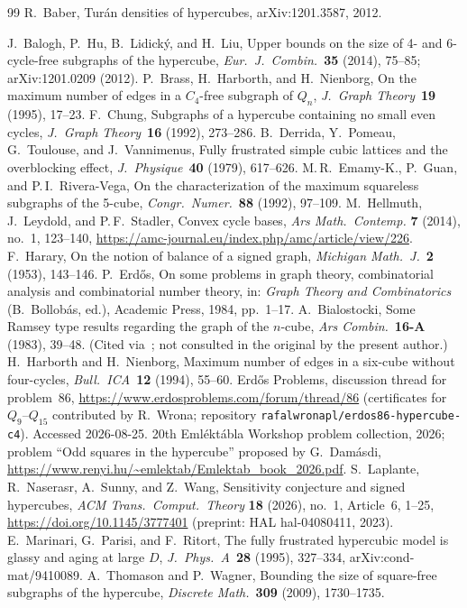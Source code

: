 \documentclass[12pt,a4paper]{article}
\theoremstyle{definition}
\begin{document}
\begin{thebibliography}{99}
R.~Baber,
Tur\'an densities of hypercubes,
arXiv:1201.3587, 2012.

 J.~Balogh, P.~Hu, B.~Lidick\'y, and H.~Liu, Upper bounds on
  the size of 4- and 6-cycle-free subgraphs of the hypercube,
  \textit{Eur.\ J.\ Combin.}\ \textbf{35} (2014), 75--85; arXiv:1201.0209 (2012).
 P.~Brass, H.~Harborth, and H.~Nienborg, On the maximum number
  of edges in a $C_4$-free subgraph of $Q_n$,
  \textit{J.\ Graph Theory}\ \textbf{19} (1995), 17--23.
 F.~Chung, Subgraphs of a hypercube containing no small even
  cycles, \textit{J.\ Graph Theory}\ \textbf{16} (1992), 273--286.
 B.~Derrida, Y.~Pomeau, G.~Toulouse, and J.~Vannimenus,
  Fully frustrated simple cubic lattices and the overblocking effect,
  \textit{J.\ Physique}\ \textbf{40} (1979), 617--626.
 M.\,R.~Emamy-K., P.~Guan, and P.\,I.~Rivera-Vega, On the
  characterization of the maximum squareless subgraphs of the 5-cube,
  \textit{Congr.\ Numer.}\ \textbf{88} (1992), 97--109.
 M.~Hellmuth, J.~Leydold, and P.\,F.~Stadler, Convex cycle
  bases, \textit{Ars Math.\ Contemp.} \textbf{7} (2014), no.~1, 123--140,
  \url{https://amc-journal.eu/index.php/amc/article/view/226}.
 F.~Harary, On the notion of balance of a signed graph,
  \textit{Michigan Math.\ J.}\ \textbf{2} (1953), 143--146.
 P.~Erd\H{o}s, On some problems in graph theory, combinatorial
  analysis and combinatorial number theory, in: \textit{Graph Theory and
  Combinatorics} (B.~Bollob\'as, ed.), Academic Press, 1984, pp.~1--17.
 A.~Bialostocki, Some Ramsey type results regarding the graph
  of the $n$-cube, \textit{Ars Combin.}\ \textbf{16-A} (1983), 39--48. (Cited
  via~\cite{LNSW26}; not consulted in the original by the present author.)
 H.~Harborth and H.~Nienborg, Maximum number of edges in a
  six-cube without four-cycles, \textit{Bull.\ ICA}\ \textbf{12} (1994), 55--60.
 Erd\H{o}s Problems, discussion thread for problem~86,
  \url{https://www.erdosproblems.com/forum/thread/86}
  (certificates for $Q_9$--$Q_{15}$ contributed by R.~Wrona; repository
  \texttt{rafalwronapl/erdos86-hypercube-c4}). Accessed 2026-08-25.
 20th Emléktábla Workshop problem collection, 2026;
  problem ``Odd squares in the hypercube'' proposed by G.~Dam\'asdi,
  \url{https://www.renyi.hu/~emlektab/Emlektab_book_2026.pdf}.
 S.~Laplante, R.~Naserasr, A.~Sunny, and Z.~Wang,
  Sensitivity conjecture and signed hypercubes,
  \textit{ACM Trans.\ Comput.\ Theory} \textbf{18} (2026), no.~1, Article~6, 1--25,
  \url{https://doi.org/10.1145/3777401}
  (preprint: HAL hal-04080411, 2023).
 E.~Marinari, G.~Parisi, and F.~Ritort, The fully frustrated
  hypercubic model is glassy and aging at large $D$,
  \textit{J.\ Phys.\ A}\ \textbf{28} (1995), 327--334, arXiv:cond-mat/9410089.
 A.~Thomason and P.~Wagner, Bounding the size of square-free
  subgraphs of the hypercube, \textit{Discrete Math.}\ \textbf{309} (2009),
  1730--1735.
\end{thebibliography}
\end{document}
